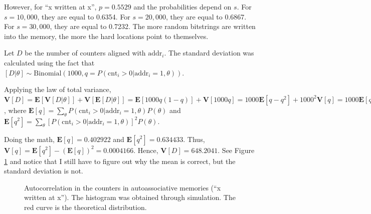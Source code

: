 However, for ``x written at x'', $p=0.5529$ and the probabilities depend on $s$. For $s=10,000$, they are equal to 0.6354. For $s=20,000$, they are equal to 0.6867. For $s=30,000$, they are equal to 0.7232. The more random bitstrings are written into the memory, the more the hard locations point to themselves.

Let $D$ be the number of counters aligned with $\text{addr}_i$. The standard deviation was calculated using the fact that $[D|\theta] \sim \text{Binomial}(1000, q=P(\text{cnt}_i > 0 | \text{addr}_i=1, \theta))$.

Applying the law of total variance, $\mathbf{V}[D] = \mathbf{E}[\mathbf{V}[D|\theta]] + \mathbf{V}[\mathbf{E}[D|\theta]] = \mathbf{E}[1000 q (1-q)] + \mathbf{V}[1000 q] = 1000 \mathbf{E}[q-q^2] + 1000^2 \mathbf{V}[q] = 1000 \mathbf{E}[q](1-\mathbf{E}[q]) + 1000(1000-1)\mathbf{V}[q]$, where $\mathbf{E}[q] = \sum_\theta P(\text{cnt}_i > 0 | \text{addr}_i=1, \theta) P(\theta)$ and $\mathbf{E}[q^2] = \sum_\theta [P(\text{cnt}_i > 0 | \text{addr}_i=1, \theta)]^2 P(\theta)$.

Doing the math, $\mathbf{E}[q] = 0.402922$ and $\mathbf{E}[q^2] = 0.634433$. Thus, $\mathbf{V}[q] = \mathbf{E}[q^2] - (\mathbf{E}[q])^2 = 0.0004166$. Hence, $\mathbf{V}[D] = 648.2041$. See Figure \ref{fig:sdm-corr-prob} and notice that I still have to figure out why the mean is correct, but the standard deviation is not.

\begin{figure}[h!]
  \centering

  \caption{Autocorrelation in the counters in autoassociative memories (``x written at x''). The histogram was obtained through simulation. The red curve is the theoretical distribution.}
  \label{fig:sdm-corr-prob}
\end{figure}



